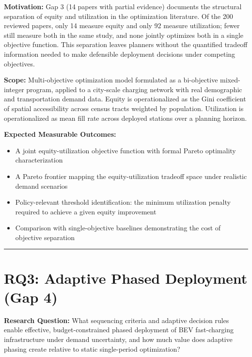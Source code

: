 \documentclass[letterpaper, 12pt, oneside, doublespacing]{Thesis}
\begin{document}
\noindent \textbf{Motivation:} Gap 3 (14 papers with partial evidence) documents the structural separation of equity and utilization in the optimization literature. Of the 200 reviewed papers, only 14 measure equity and only 92 measure utilization; fewer still measure both in the same study, and none jointly optimizes both in a single objective function. This separation leaves planners without the quantified tradeoff information needed to make defensible deployment decisions under competing objectives.



\noindent \textbf{Scope:} Multi-objective optimization model formulated as a bi-objective mixed-integer program, applied to a city-scale charging network with real demographic and transportation demand data. Equity is operationalized as the Gini coefficient of spatial accessibility across census tracts weighted by population. Utilization is operationalized as mean fill rate across deployed stations over a planning horizon.



\noindent \textbf{Expected Measurable Outcomes:}

\begin{itemize}
  \item A joint equity-utilization objective function with formal Pareto optimality characterization
  \item A Pareto frontier mapping the equity-utilization tradeoff space under realistic demand scenarios
  \item Policy-relevant threshold identification: the minimum utilization penalty required to achieve a given equity improvement
  \item Comparison with single-objective baselines demonstrating the cost of objective separation
\end{itemize}


\bigskip\noindent\rule{\linewidth}{0.4pt}\bigskip


\section{RQ3: Adaptive Phased Deployment (Gap 4)}


\noindent \textbf{Research Question:} What sequencing criteria and adaptive decision rules enable effective, budget-constrained phased deployment of BEV fast-charging infrastructure under demand uncertainty, and how much value does adaptive phasing create relative to static single-period optimization?
\end{document}
